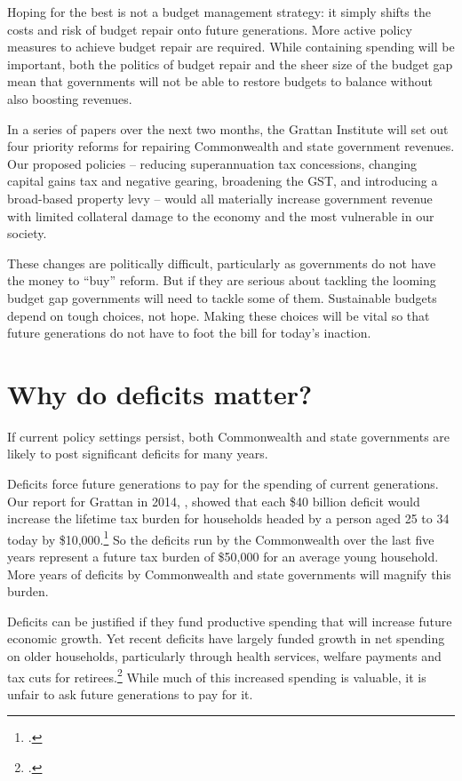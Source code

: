 \documentclass[twoside,english]{palatinob5portrait}
\begin{document}
\begin{overview}[-40pt]
Hoping for the best is not a budget management strategy: it simply shifts the costs and risk of budget repair onto future generations. More active policy measures to achieve budget repair are required. While containing spending will be important, both the politics of budget repair and the sheer size of the budget gap mean that governments will not be able to restore budgets to balance without also boosting revenues.

In a series of papers over the next two months, the Grattan Institute will set out four priority reforms for repairing Commonwealth and state government revenues. Our proposed policies – reducing superannuation tax concessions, changing capital gains tax and negative gearing, broadening the GST, and introducing a broad-based property levy – would all materially increase government revenue with limited collateral damage to the economy and the most vulnerable in our society.

These changes are politically difficult, particularly as governments do not have the money to “buy” reform. But if they are serious about tackling the looming budget gap governments will need to tackle some of them. Sustainable budgets depend on tough choices, not hope. Making these choices will be vital so that future generations do not have to foot the bill for today’s inaction.

\end{overview}
\makeatletter\@openrightfalse
\cleardoubleevenstandardpage
\chapter{Why do deficits matter?}\label{chapter:FISCAL-1}
If current policy settings persist, both Commonwealth and state governments are likely to post significant deficits for many years. 

Deficits force future generations to pay for the spending of current generations. Our report for Grattan in 2014, , showed that each \$40 billion deficit would increase the lifetime tax burden for households headed by a person aged 25 to 34 today by \$10,000.\footcite[][9]{DaleyWoodWeidmannEtAl2014} So the deficits run by the Commonwealth over the last five years represent a future tax burden of \$50,000 for an average young household. More years of deficits by Commonwealth and state governments will magnify this burden. 

Deficits can be justified if they fund productive spending that will increase future economic growth. Yet recent deficits have largely funded growth in net spending on older households, particularly through health services, welfare payments and tax cuts for retirees.\footcite[][9]{DaleyWoodWeidmannEtAl2014}  While much of this increased spending is valuable, it is unfair to ask future generations to pay for it. 
\end{document}
